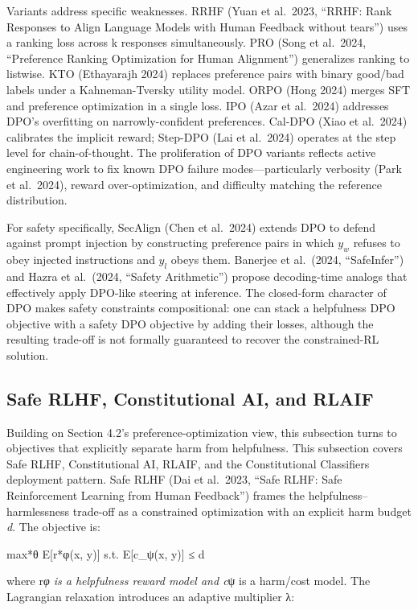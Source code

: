 Variants address specific weaknesses. RRHF (Yuan et al.~2023, ``RRHF: Rank Responses to Align Language Models with Human Feedback without tears'') uses a ranking loss across k responses simultaneously. PRO (Song et al.~2024, ``Preference Ranking Optimization for Human Alignment'') generalizes ranking to listwise. KTO (Ethayarajh 2024) replaces preference pairs with binary good/bad labels under a Kahneman-Tversky utility model. ORPO (Hong 2024) merges SFT and preference optimization in a single loss. IPO (Azar et al.~2024) addresses DPO's overfitting on narrowly-confident preferences. Cal-DPO (Xiao et al.~2024) calibrates the implicit reward; Step-DPO (Lai et al.~2024) operates at the step level for chain-of-thought. The proliferation of DPO variants reflects active engineering work to fix known DPO failure modes---particularly verbosity (Park et al.~2024), reward over-optimization, and difficulty matching the reference distribution.

For safety specifically, SecAlign (Chen et al.~2024) extends DPO to defend against prompt injection by constructing preference pairs in which \(y_w\) refuses to obey injected instructions and \(y_l\) obeys them. Banerjee et al.~(2024, ``SafeInfer'') and Hazra et al.~(2024, ``Safety Arithmetic'') propose decoding-time analogs that effectively apply DPO-like steering at inference. The closed-form character of DPO makes safety constraints compositional: one can stack a helpfulness DPO objective with a safety DPO objective by adding their losses, although the resulting trade-off is not formally guaranteed to recover the constrained-RL solution.

\subsection{Safe RLHF, Constitutional AI, and RLAIF}\label{safe-rlhf-constitutional-ai-and-rlaif}

Building on Section 4.2's preference-optimization view, this subsection turns to objectives that explicitly separate harm from helpfulness. This subsection covers Safe RLHF, Constitutional AI, RLAIF, and the Constitutional Classifiers deployment pattern. Safe RLHF (Dai et al.~2023, ``Safe RLHF: Safe Reinforcement Learning from Human Feedback'') frames the helpfulness--harmlessness trade-off as a constrained optimization with an explicit harm budget \emph{d}. The objective is:

max*θ E{[}r*φ(x, y){]} s.t. E{[}c\_ψ(x, y){]} ≤ d

where r\emph{φ is a helpfulness reward model and c}ψ is a harm/cost model. The Lagrangian relaxation introduces an adaptive multiplier λ:


